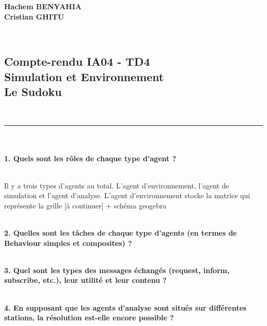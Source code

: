 \documentclass[11pt]{report}
\begin{document}
\selectfont

\noindent
\textbf{Hachem BENYAHIA}
~\\
\textbf{Cristian GHITU}

~\\
\begin{center}
\section*{Compte-rendu IA04 - TD4 ~\\ Simulation et Environnement ~\\ Le Sudoku}

~\\
\rule{\textwidth}{1pt}
\end{center}

~\\\\
\textbf{1. Quels sont les rôles de chaque type d'agent ?}

~\\
Il y a trois types d'agents au total. L'agent d'environnement, l'agent de simulation et l'agent d'analyse. L'agent d'environnement stocke la matrice qui représente la grille [à continuer] + schéma geogebra

~\\
\textbf{2. Quelles sont les tâches de chaque type d'agents (en termes de Behaviour simples et
composites) ?}

~\\
\textbf{3. Quel sont les types des messages échangés (request, inform, subscribe, etc.), leur
utilité et leur contenu ?}

~\\
\textbf{4. En supposant que les agents d'analyse sont situés sur différentes stations, la résolution
est-elle encore possible ?}
\end{document}
